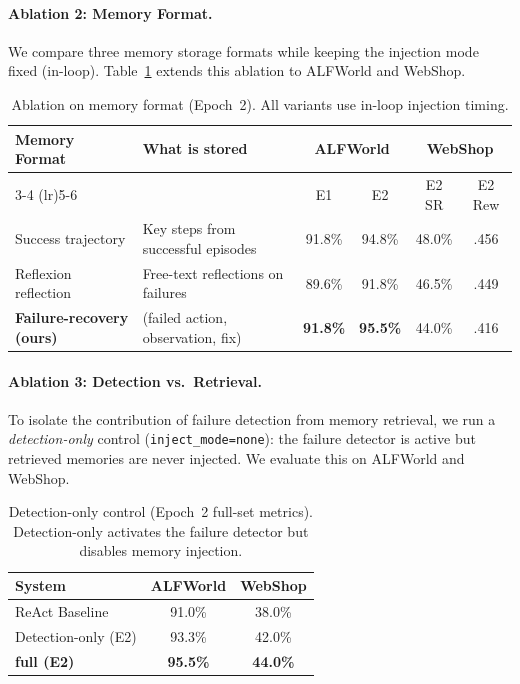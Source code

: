 \paragraph{Ablation 2: Memory Format.}
We compare three memory storage formats while keeping the injection mode fixed (in-loop). Table~\ref{tab:ablation_format} extends this ablation to ALFWorld and WebShop.

\begin{table}[h]
\centering
\caption{Ablation on memory format (Epoch~2). All variants use in-loop injection timing.}
\label{tab:ablation_format}
\small
\begin{tabular}{lp{3.5cm}cccc}
\toprule
\multirow{2}{*}{Memory Format} & \multirow{2}{*}{What is stored} & \multicolumn{2}{c}{ALFWorld} & \multicolumn{2}{c}{WebShop} \\
\cmidrule(lr){3-4} \cmidrule(lr){5-6}
 & & E1 & E2 & E2 SR & E2 Rew \\
\midrule
Success trajectory & Key steps from successful episodes & 91.8\% & 94.8\% & 48.0\% & .456 \\
Reflexion reflection & Free-text reflections on failures & 89.6\% & 91.8\% & 46.5\% & .449 \\
\textbf{Failure-recovery (ours)} & (failed action, observation, fix) & \textbf{91.8\%} & \textbf{95.5\%} & 44.0\% & .416 \\
\bottomrule
\end{tabular}
\end{table}

\paragraph{Ablation 3: Detection vs.\ Retrieval.}
To isolate the contribution of failure detection from memory retrieval, we run a \emph{detection-only} control (\texttt{inject\_mode=none}): the failure detector is active but retrieved memories are never injected. We evaluate this on ALFWorld and WebShop.

\begin{table}[h]
\centering
\caption{Detection-only control (Epoch~2 full-set metrics). Detection-only activates the failure detector but disables memory injection.}
\label{tab:detection_only}
\small
\begin{tabular}{lcc}
\toprule
System & ALFWorld & WebShop \\
\midrule
ReAct Baseline & 91.0\% & 38.0\% \\
Detection-only (E2) & 93.3\% & 42.0\% \\
\textbf{\method{} full (E2)} & \textbf{95.5\%} & \textbf{44.0\%} \\
\bottomrule
\end{tabular}
\end{table}

